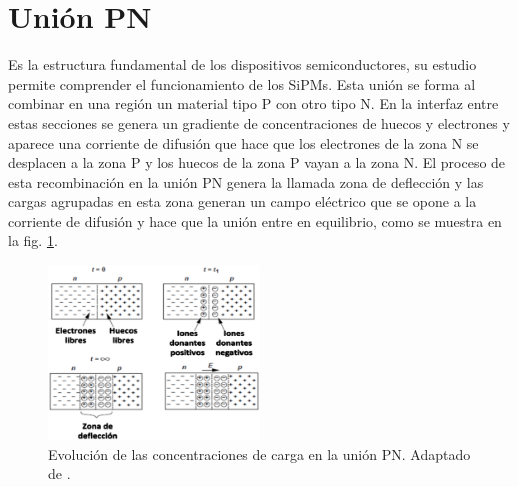 \section{Unión PN}
Es la estructura fundamental de los dispositivos semiconductores, su estudio permite comprender el funcionamiento de los SiPMs. Esta unión se forma al combinar en una región un material tipo P con otro tipo N. En la interfaz entre estas secciones se genera un gradiente de concentraciones de huecos y electrones y aparece una corriente de difusión que hace que los electrones de la zona N se desplacen a la zona P y los huecos de la zona P vayan a la zona N. El proceso de esta recombinación en la unión PN genera la llamada zona de deflección y las cargas agrupadas en esta zona generan un campo eléctrico que se opone a la corriente de difusión y hace que la unión entre en equilibrio, como se muestra en la fig. \ref{fig:PNjuntion}.
\begin{figure}[h!]
\begin{centering}
  \includegraphics[width=0.5\textwidth]{Images/UnionPN.eps}
  \caption{Evolución de las concentraciones de carga en la unión PN. Adaptado de \citep{Book_razavi}.}
  \label{fig:PNjuntion}
  \par\end{centering}
\end{figure}
